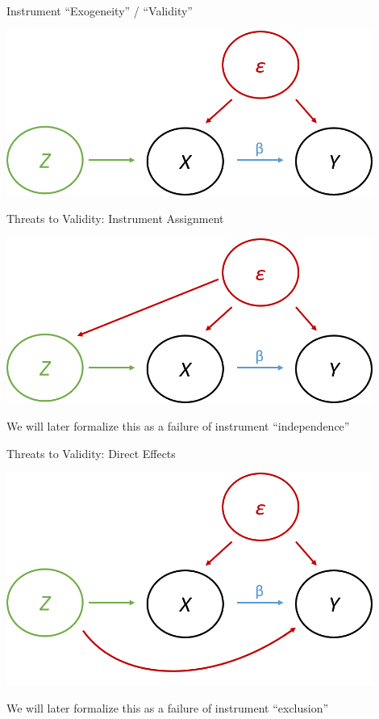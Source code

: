 \documentclass[11pt,english]{beamer}
\begin{document}
\begin{frame}{Instrument ``Exogeneity'' / ``Validity''}

\begin{center}
	\includegraphics[width=0.9\textwidth]{figures/dag3.png}
\end{center}

\end{frame}

\begin{frame}{Threats to Validity: Instrument Assignment}
\vspace{0.2cm}

\begin{center}
	\includegraphics[width=0.9\textwidth]{figures/dag4.png}
\end{center}
We will later formalize this as a failure of instrument ``independence''

\end{frame}

\begin{frame}{Threats to Validity: Direct Effects}
\vspace{0.2cm}

\begin{center}
	\includegraphics[width=0.9\textwidth]{figures/dag5.png}
\end{center}
We will later formalize this as a failure of instrument ``exclusion''

\end{frame}
\end{document}
